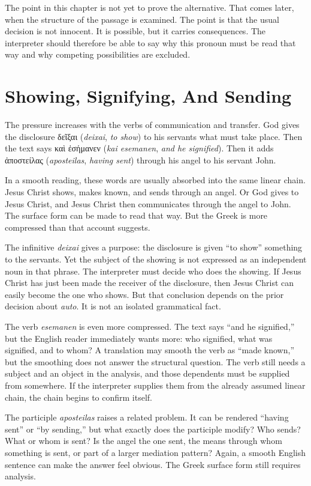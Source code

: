 The point in this chapter is not yet to prove the alternative. That comes later, when the structure of the passage is examined. The point is that the usual decision is not innocent. It is possible, but it carries consequences. The interpreter should therefore be able to say why this pronoun must be read that way and why competing possibilities are excluded.

\section{Showing, Signifying, And Sending}

The pressure increases with the verbs of communication and transfer. God gives the disclosure \textgreek{δεῖξαι} (\textit{deixai}, \textit{to show}) to his servants what must take place. Then the text says \textgreek{καὶ ἐσήμανεν} (\textit{kai esemanen}, \textit{and he signified}). Then it adds \textgreek{ἀποστείλας} (\textit{aposteilas}, \textit{having sent}) through his angel to his servant John.

In a smooth reading, these words are usually absorbed into the same linear chain. Jesus Christ shows, makes known, and sends through an angel. Or God gives to Jesus Christ, and Jesus Christ then communicates through the angel to John. The surface form can be made to read that way. But the Greek is more compressed than that account suggests.

The infinitive \textit{deixai} gives a purpose: the disclosure is given ``to show'' something to the servants. Yet the subject of the showing is not expressed as an independent noun in that phrase. The interpreter must decide who does the showing. If Jesus Christ has just been made the receiver of the disclosure, then Jesus Christ can easily become the one who shows. But that conclusion depends on the prior decision about \textit{auto}. It is not an isolated grammatical fact.

The verb \textit{esemanen} is even more compressed. The text says ``and he signified,'' but the English reader immediately wants more: who signified, what was signified, and to whom? A translation may smooth the verb as ``made known,'' but the smoothing does not answer the structural question. The verb still needs a subject and an object in the analysis, and those dependents must be supplied from somewhere. If the interpreter supplies them from the already assumed linear chain, the chain begins to confirm itself.

The participle \textit{aposteilas} raises a related problem. It can be rendered ``having sent'' or ``by sending,'' but what exactly does the participle modify? Who sends? What or whom is sent? Is the angel the one sent, the means through whom something is sent, or part of a larger mediation pattern? Again, a smooth English sentence can make the answer feel obvious. The Greek surface form still requires analysis.

